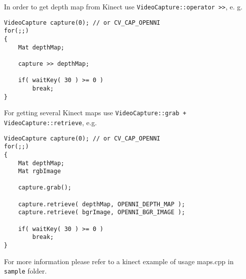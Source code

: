 In order to get depth map from Kinect use \texttt{VideoCapture::operator >>}, e. g.
\begin{lstlisting}
VideoCapture capture(0); // or CV_CAP_OPENNI
for(;;)
{
	Mat depthMap;
	
	capture >> depthMap;
	
	if( waitKey( 30 ) >= 0 )
		break;
}
\end{lstlisting}
For getting several Kinect maps use \texttt{VideoCapture::grab + VideoCapture::retrieve}, e.g.
\begin{lstlisting}
VideoCapture capture(0); // or CV_CAP_OPENNI
for(;;)
{
	Mat depthMap;
	Mat rgbImage
	
	capture.grab();
	
	capture.retrieve( depthMap, OPENNI_DEPTH_MAP );
	capture.retrieve( bgrImage, OPENNI_BGR_IMAGE );
	
	if( waitKey( 30 ) >= 0 )
		break;
}
\end{lstlisting}

For more information please refer to a kinect example of usage maps.cpp in \texttt{sample} folder.

\fi
